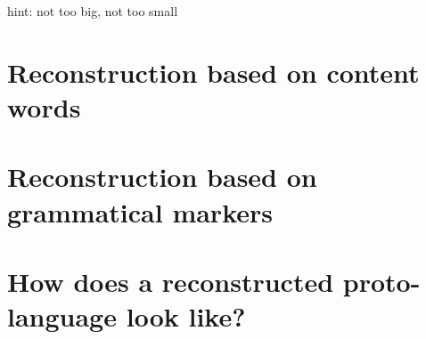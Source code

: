 \documentclass[a4paper, oneside, scheme=plain, 12pt]{article}
\begin{document}
hint: not too big, not too small

\section{Reconstruction based on content words}

\section{Reconstruction based on grammatical markers}

\section{How does a reconstructed proto-language look like?}

\printbibliography
\end{document}
